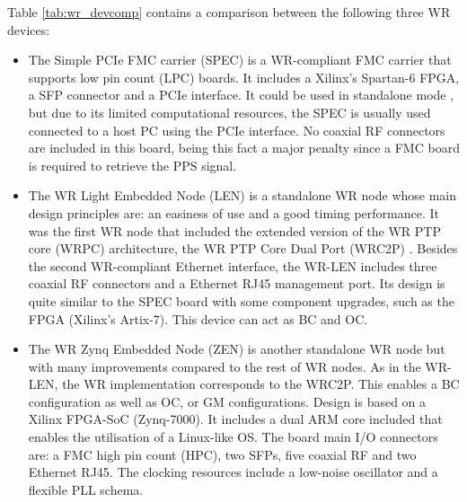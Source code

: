 Table \ref{tab:wr_devcomp} contains a comparison between the following three WR
devices: \begin{itemize} \item The Simple PCIe FMC carrier (SPEC)
			\cite{ohwr:spec} is a WR-compliant FMC carrier that
			supports low pin count (LPC) boards. It includes a
			Xilinx's Spartan-6 FPGA, a SFP connector and a PCIe
			interface. It could be used in standalone mode
			\cite{migueljl-paper-wr-spec}, but due to its limited
			computational resources, the SPEC is usually used
			connected to a host PC using the PCIe interface.  No
			coaxial RF connectors are included in this board, being this fact
			a major penalty since a FMC board is required to retrieve the PPS signal.
	
	\item The WR Light Embedded Node (LEN) \cite{sevensols:wr_len} is a
		standalone WR node whose main design principles are: an easiness
		of use and a good timing performance. It was the first WR node
		that included the extended version of the WR PTP core (WRPC)
		architecture, the WR PTP Core Dual Port (WRC2P)
		\cite{torres2016scalability}. Besides the second WR-compliant
		Ethernet interface, the WR-LEN includes three coaxial RF
		connectors and a Ethernet RJ45 management port. Its design is
		quite similar to the SPEC board with some component
		upgrades, such as the FPGA (Xilinx's Artix-7). This device can act as BC and OC.
	
	\item The WR Zynq Embedded Node (ZEN) \cite{sevensols:wr_zen} is another
		standalone WR node but with many improvements compared to the
		rest of WR nodes. As in the WR-LEN, the WR implementation
		corresponds to the WRC2P.  This enables a BC configuration as
		well as OC, or GM configurations. Design is based on a Xilinx FPGA-SoC
		(Zynq-7000). It includes a dual ARM core included that enables the utilisation of a Linux-like
		OS. The board main I/O connectors are: a FMC high pin count
		(HPC), two SFPs, five coaxial RF and two Ethernet RJ45. The
		clocking resources include a low-noise oscillator and a flexible PLL schema.
\end{itemize}

